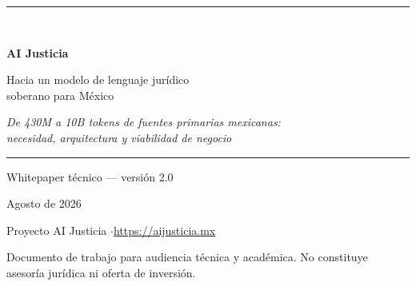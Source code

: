 \documentclass[11pt,a4paper]{article}
\begin{document}
\begin{titlepage}
\pagecolor{navy}\color{white}
\vspace*{2.2cm}
{\noindent\rule{\textwidth}{1.2pt}}\\[1.6em]
{\Huge\bfseries AI Justicia\par}
\vspace{0.5em}
{\LARGE Hacia un modelo de lenguaje jurídico\\ soberano para México\par}
\vspace{1.1em}
{\large\itshape De 430M a 10B tokens de fuentes primarias mexicanas:\\ necesidad, arquitectura y viabilidad de negocio\par}
\vspace{1.6em}
{\noindent\rule{\textwidth}{1.2pt}}

\vspace{2.2cm}
{\large Whitepaper técnico --- versión 2.0\par}
\vspace{0.4em}
{\large Agosto de 2026\par}

\vfill
{\small Proyecto AI Justicia \quad$\cdot$\quad \url{https://aijusticia.mx}\par}
\vspace{0.5em}
{\small Documento de trabajo para audiencia técnica y académica. No constituye asesoría jurídica ni oferta de inversión.\par}
\end{titlepage}
\pagecolor{white}\color{black}


\newpage
\tableofcontents
\newpage












\newpage
{}

\end{document}
